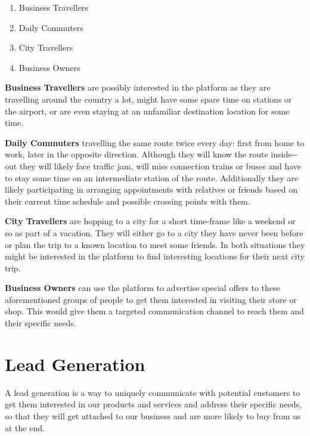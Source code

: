 \documentclass[a4paper]{article}
\begin{document}
\begin{enumerate}
\item  Business Travellers
\item  Daily Commuters
\item  City Travellers
\item  Business Owners
\end{enumerate}

\textbf{Business Travellers} are possibly interested in the platform as they are travelling around the country a lot, might have some spare time on stations or the airport, or are even staying at an unfamiliar destination location for some time. \par \vspace{0.2cm}
\textbf{Daily Commuters} travelling the same route twice every day: first from home to work, later in the opposite direction. Although they will know the route inside-­out they will likely face traffic jam, will miss connection trains or buses and have to stay some time on an intermediate station of the route. Additionally they are likely participating in arranging appointments with relatives or friends based on their current time schedule and possible crossing points with them. \par \vspace{0.2cm}
\textbf{City Travellers} are hopping to a city for a short time-frame like a weekend or so as part of a vacation. They will either go to a city they have never been before or plan the trip to a known location to meet some friends. In both situations they might be interested in the platform to find interesting locations for their next city trip. \par \vspace{0.2cm}
\textbf{Business Owners} can use the platform to advertise special offers to these aforementioned groups of people to get them interested in visiting their store or shop. This would give them a targeted communication channel to reach them and their specific needs.


\section{Lead Generation} %
\label{sec:lead}

A lead generation is a way to uniquely communicate with potential customers to get them interested in our products and services and address their specific needs, so that they will get attached to our business and are more likely to buy from us at the end.
\end{document}
